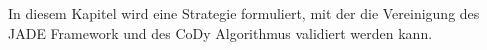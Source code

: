 In diesem Kapitel wird eine Strategie formuliert, mit der die Vereinigung des JADE Framework und des CoDy Algorithmus validiert werden kann.
